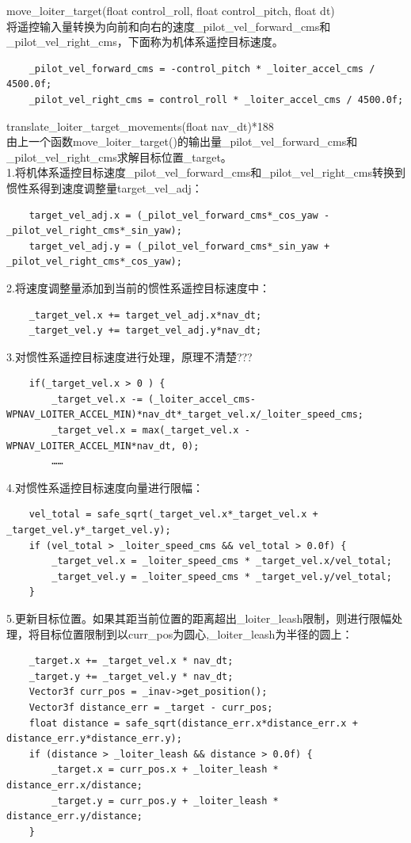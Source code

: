 \documentclass[a4paper,10pt]{ctexart} %
\begin{document}
\vspace{8pt}
\noindent move\_loiter\_target(float control\_roll, float control\_pitch, float dt)\\
将遥控输入量转换为向前和向右的速度\_pilot\_vel\_forward\_cms和\_pilot\_vel\_right\_cms，下面称为机体系遥控目标速度。
\begin{lstlisting}
    _pilot_vel_forward_cms = -control_pitch * _loiter_accel_cms / 4500.0f;
    _pilot_vel_right_cms = control_roll * _loiter_accel_cms / 4500.0f;
\end{lstlisting}

\vspace{8pt}
\noindent translate\_loiter\_target\_movements(float nav\_dt){\color{red}*188}\\
由上一个函数move\_loiter\_target()的输出量\_pilot\_vel\_forward\_cms和\_pilot\_vel\_right\_cms求解目标位置\_target。\\
1.将机体系遥控目标速度\_pilot\_vel\_forward\_cms和\_pilot\_vel\_right\_cms转换到惯性系得到速度调整量target\_vel\_adj：
\begin{lstlisting}
    target_vel_adj.x = (_pilot_vel_forward_cms*_cos_yaw - _pilot_vel_right_cms*_sin_yaw);
    target_vel_adj.y = (_pilot_vel_forward_cms*_sin_yaw + _pilot_vel_right_cms*_cos_yaw);
\end{lstlisting}
2.将速度调整量添加到当前的惯性系遥控目标速度中：
\begin{lstlisting}
    _target_vel.x += target_vel_adj.x*nav_dt;
    _target_vel.y += target_vel_adj.y*nav_dt;
\end{lstlisting}
3.对惯性系遥控目标速度进行处理，原理不清楚???
\begin{lstlisting}
    if(_target_vel.x > 0 ) {
        _target_vel.x -= (_loiter_accel_cms-WPNAV_LOITER_ACCEL_MIN)*nav_dt*_target_vel.x/_loiter_speed_cms;
        _target_vel.x = max(_target_vel.x - WPNAV_LOITER_ACCEL_MIN*nav_dt, 0);
        ……
\end{lstlisting}
4.对惯性系遥控目标速度向量进行限幅：
\begin{lstlisting}
    vel_total = safe_sqrt(_target_vel.x*_target_vel.x + _target_vel.y*_target_vel.y);
    if (vel_total > _loiter_speed_cms && vel_total > 0.0f) {
        _target_vel.x = _loiter_speed_cms * _target_vel.x/vel_total;
        _target_vel.y = _loiter_speed_cms * _target_vel.y/vel_total;
    }
\end{lstlisting}
5.更新目标位置。如果其距当前位置的距离超出\_loiter\_leash限制，则进行限幅处理，将目标位置限制到以curr\_pos为圆心,\_loiter\_leash为半径的圆上：
\begin{lstlisting}
    _target.x += _target_vel.x * nav_dt;
    _target.y += _target_vel.y * nav_dt;
    Vector3f curr_pos = _inav->get_position();
    Vector3f distance_err = _target - curr_pos;
    float distance = safe_sqrt(distance_err.x*distance_err.x + distance_err.y*distance_err.y);
    if (distance > _loiter_leash && distance > 0.0f) {
        _target.x = curr_pos.x + _loiter_leash * distance_err.x/distance;
        _target.y = curr_pos.y + _loiter_leash * distance_err.y/distance;
    }
\end{lstlisting}
\end{document}
